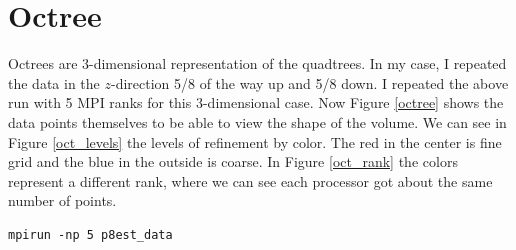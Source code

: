 \documentclass[12pt,letterpaper]{article}
\begin{document}
\section{Octree}

Octrees are 3-dimensional representation of the quadtrees. In my case, I repeated the data in the $z$-direction 5/8 of the way up and 5/8 down. I repeated the above run with 5 MPI ranks for this 3-dimensional case. Now Figure \ref{octree} shows the data points themselves to be able to view the shape of the volume. We can see in Figure \ref{oct_levels} the levels of refinement by color. The red in the center is fine grid and the blue in the outside is coarse. In Figure \ref{oct_rank} the colors represent a different rank, where we can see each processor got about the same number of points.


\begin{verbatim}
mpirun -np 5 p8est_data
\end{verbatim}
\end{document}
